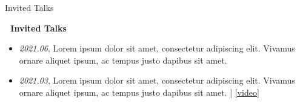 \begin{section}{Invited Talks}
\label{sec:talks}

\begin{center}
\huge{\textbf{💬 Invited Talks}}
\end{center}

\begin{itemize}
  \item \textit{2021.06}, Lorem ipsum dolor sit amet, consectetur adipiscing elit. Vivamus ornare aliquet ipsum, ac tempus justo dapibus sit amet.
  \item \textit{2021.03}, Lorem ipsum dolor sit amet, consectetur adipiscing elit. Vivamus ornare aliquet ipsum, ac tempus justo dapibus sit amet. | \href{https://github.com/}{[video]}
\end{itemize}
\end{section} 